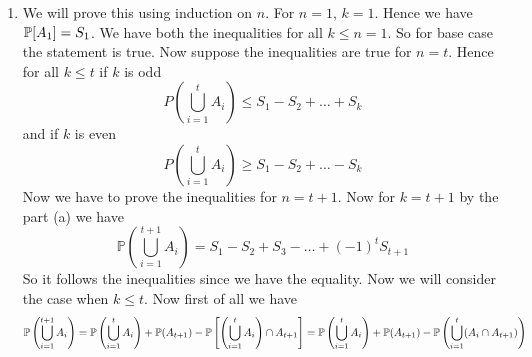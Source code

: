 \documentclass[a4paper, 11pt]{article}
\begin{document}
{\begin{enumerate}[label=(\alph*)]
\item We will prove this using induction on $n$. For $n=1$, $k=1$. Hence we have $\mathbb{P}[A_1]=S_1$. We have both the inequalities for all $k\leq n=1$. So for base case the statement is true. Now suppose the inequalities are true for $n=t$. Hence for all $k\leq t$ if $k$ is odd $$P\left(\bigcup_{i=1}^t A_i\right) \leq S_1-S_2+\ldots+S_k$$ and if $k$ is even $$P\left(\bigcup_{i=1}^t A_i\right) \geq S_1-S_2+\ldots-S_k$$Now we have to prove the inequalities for $n=t+1$. Now for $k=t+1$ by the part (a) we have $$\mathbb{P}\left(\bigcup_{i=1}^{t+1} A_i\right)=S_1-S_2+S_3-\ldots+(-1)^{t} S_{t+1}$$So it follows the inequalities since we have the equality. Now we will consider the case when $k\leq t$. Now first of all we have 
\begin{equation}
	\mathbb{P}\left(\bigcup_{i=1}^{t+1}A_i\right)=\mathbb{P}\left(\bigcup_{i=1}^t A_i\right)+\mathbb{P}(A_{t+1})-\mathbb{P}\left[\left(\bigcup_{i=1}^t A_i \right)\cap A_{t+1}\right]=\mathbb{P}\left(\bigcup_{i=1}^t A_i\right)+\mathbb{P}(A_{t+1})-\mathbb{P}\left(\bigcup_{i=1}^t (A_i\cap A_{t+1})\right)\label{eq1}
\end{equation}

\end{enumerate}}
\end{document}
